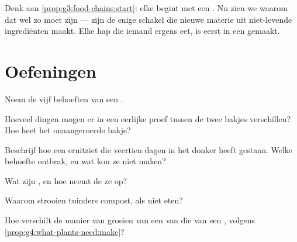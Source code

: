 \begin{remark}\label{rem:g4:what-plants-need:everyone}
Denk aan \cref{prop:g3:food-chains:start}: elke  begint met
een . Nu zien we waarom dat wel zo moet zijn ---  zijn de
enige schakel die nieuwe materie uit niet-levende ingrediënten maakt.
Elke hap die iemand ergens eet, is eerst in een  gemaakt.
\end{remark}

\section{Oefeningen}

\begin{exercise}[$\star$]\label{exo:g4:what-plants-need:1}
Noem de vijf behoeften van een .
\end{exercise}

\begin{exercise}[$\star$]\label{exo:g4:what-plants-need:2}
Hoeveel dingen mogen er in een eerlijke proef tussen de twee bakjes
verschillen? Hoe heet het onaangeroerde bakje?
\end{exercise}

\begin{exercise}[$\star$]\label{exo:g4:what-plants-need:3}
Beschrijf hoe een  eruitziet die veertien dagen in het donker
heeft gestaan. Welke behoefte ontbrak, en wat kon ze niet maken?
\end{exercise}

\begin{exercise}[$\star$]\label{exo:g4:what-plants-need:4}
Wat zijn , en hoe neemt de  ze op?
\end{exercise}

\begin{exercise}[$\star$]\label{exo:g4:what-plants-need:5}
Waarom strooien tuinders compost, als  niet eten?
\end{exercise}

\begin{exercise}[$\star$]\label{exo:g4:what-plants-need:6}
Hoe verschilt de manier van groeien van een  van die van een ,
volgens \cref{prop:g4:what-plants-need:make}?
\end{exercise}

